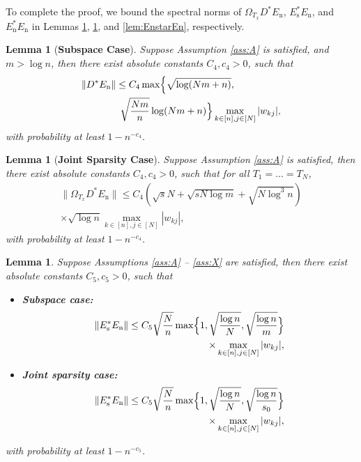 \documentclass[11pt,journal]{IEEEtran}
\newcommand{\rms}{\mathrm{s}}
\newcommand{\rmn}{\mathrm{n}}
\newcommand{\norm}[1]{\|{#1}\|}
\newtheorem{lemma}[theorem]{Lemma}
\begin{document}
\begin{IEEEproof}
To complete the proof, we bound the spectral norms of $\Omega_{T_x} D^* E_\rmn$, $E_\rms^*E_\rmn$, and $E_\rmn^* E_\rmn$ in Lemmas \ref{lem:DstarEn}, \ref{lem:EsstarEn}, and \ref{lem:EnstarEn}, respectively.
\end{IEEEproof}



\begin{lemma}[\textbf{Subspace Case}] \label{lem:DstarEn}
Suppose Assumption \ref{ass:A} is satisfied, and $m >\log n$, then there exist absolute constants $C_4, c_4>0$, such that
\begin{align*}
& \norm{D^*E_\rmn} \leq C_4 \max\Bigl\{\sqrt{\log (Nm+n)}, \\
& \qquad\qquad \sqrt{\frac{Nm}{n}} \log (Nm+n) \Bigr\} \max_{k\in[n], j\in[N]}|w_{kj}|,
\end{align*}
with probability at least $1-n^{-c_4}$.
\end{lemma}



\begin{lemma}[\textbf{Joint Sparsity Case}] \label{lem:DstarEn_alt}
Suppose Assumption \ref{ass:A} is satisfied, then there exist absolute constants $C_4, c_4>0$, such that for all $T_1 = \dots = T_N$,
\begin{align*}
\norm{\Omega_{T_x}D^*E_\rmn} \leq C_4 (\sqrt{s}N + \sqrt{sN\log m} + \sqrt{N\log^3 n}) \\
\times \sqrt{\log n}\max_{k\in[n], j\in[N]}|w_{kj}|,
\end{align*}
with probability at least $1-n^{-c_4}$.
\end{lemma}




\begin{lemma} \label{lem:EsstarEn}
Suppose Assumptions \ref{ass:A} -- \ref{ass:X} are satisfied, then there exist absolute constants $C_5, c_5>0$, such that
\begin{itemize}
	\item \textbf{Subspace case:}
	\begin{align*}
\norm{ E_\rms^*E_\rmn } \leq C_5\sqrt{\frac{N}{n}} \max\Bigl\{1, \sqrt{\frac{\log n}{N}}, \sqrt{\frac{\log n}{m}}\Bigr\} \\
\times \max_{k\in[n], j\in[N]}|w_{kj}|,
\end{align*}

	\item \textbf{Joint sparsity case:}
	\begin{align*}
\norm{ E_\rms^*E_\rmn } \leq C_5\sqrt{\frac{N}{n}} \max\Bigl\{1, \sqrt{\frac{\log n}{N}}, \sqrt{\frac{\log n}{s_0}}\Bigr\} \\
\times \max_{k\in[n], j\in[N]}|w_{kj}|,
\end{align*}
\end{itemize}

with probability at least $1-n^{-c_5}$.
\end{lemma} 
\end{document}
